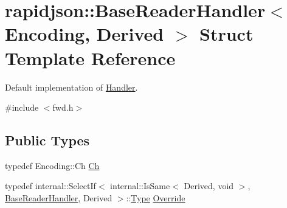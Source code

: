 \hypertarget{structrapidjson_1_1_base_reader_handler}{}\section{rapidjson\+::Base\+Reader\+Handler$<$ Encoding, Derived $>$ Struct Template Reference}
\label{structrapidjson_1_1_base_reader_handler}


Default implementation of \mbox{\hyperlink{classrapidjson_1_1_handler}{Handler}}.  




{\ttfamily \#include $<$fwd.\+h$>$}

\subsection*{Public Types}
\begin{DoxyCompactItemize}
\item 
typedef Encoding\+::\+Ch \mbox{\hyperlink{structrapidjson_1_1_base_reader_handler_a2932a8ecbb1997dda305f4dbef32ab0d}{Ch}}
\item 
typedef internal\+::\+Select\+If$<$ internal\+::\+Is\+Same$<$ Derived, void $>$, \mbox{\hyperlink{structrapidjson_1_1_base_reader_handler}{Base\+Reader\+Handler}}, Derived $>$\+::\mbox{\hyperlink{namespacerapidjson_ae79a4751c1c460ff0de5ecc07874f3e4}{Type}} \mbox{\hyperlink{structrapidjson_1_1_base_reader_handler_ae61944eee4cb6a3f7f34f3d4edce7eeb}{Override}}
\end{DoxyCompactItemize}
